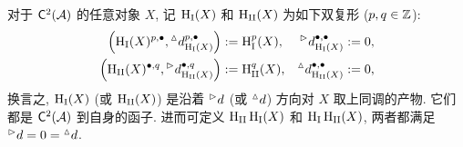 对于 $\mathsf{C}^2(\mathcal{A})$ 的任意对象 $X$, 记 $\operatorname{H}_{\mathrm{I}}(X)$ 和 $\operatorname{H}_{\mathrm{II}}(X)$ 为如下双复形 ($p,q \in \mathbb{Z}$): 
\begin{equation}\label{eqn:HIHII}\begin{aligned}
	\left( \operatorname{H}_{\mathrm{I}}(X)^{p, \bullet}, {}^\vartriangle d_{\operatorname{H}_{\mathrm{I}}(X)}^{p, \bullet} \right) & := \operatorname{H}_{\mathrm{I}}^p(X), &
	{}^\vartriangleright d_{\operatorname{H}_{\mathrm{I}}(X)}^{\bullet, \bullet} := 0, \\
	\left( \operatorname{H}_{\mathrm{II}}(X)^{\bullet, q}, {}^\vartriangleright d_{\operatorname{H}_{\mathrm{II}}(X)}^{\bullet, q} \right) & := \operatorname{H}_{\mathrm{II}}^q(X), &
	{}^\vartriangle d_{\operatorname{H}_{\mathrm{II}}(X)}^{\bullet, \bullet} := 0,
\end{aligned}\end{equation}
换言之, $\operatorname{H}_{\mathrm{I}}(X)$ (或 $\operatorname{H}_{\mathrm{II}}(X)$) 是沿着 ${}^\vartriangleright d$ (或 ${}^\vartriangle d$) 方向对 $X$ 取上同调的产物. 它们都是 $\mathsf{C}^2(\mathcal{A})$ 到自身的函子. 进而可定义 $\operatorname{H}_{\mathrm{II}} \operatorname{H}_{\mathrm{I}}(X)$ 和 $\operatorname{H}_{\mathrm{I}} \operatorname{H}_{\mathrm{II}} (X)$, 两者都满足 ${}^\vartriangleright d = 0 = {}^\vartriangle d$.


